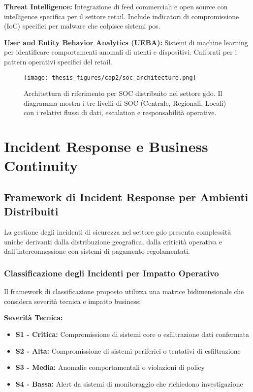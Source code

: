 \textbf{Threat Intelligence:} Integrazione di feed commerciali e open source con intelligence specifica per il settore retail. Include indicatori di compromissione (IoC) specifici per malware che colpisce sistemi \gls{pos}.

\textbf{User and Entity Behavior Analytics (UEBA):} Sistemi di machine learning per identificare comportamenti anomali di utenti e dispositivi. Calibrati per i pattern operativi specifici del retail.

\begin{figure}[htbp]
\centering
\texttt{[image: thesis\_figures/cap2/soc\_architecture.png]}
\caption{Architettura di riferimento per SOC distribuito nel settore \gls{gdo}. Il diagramma mostra i tre livelli di SOC (Centrale, Regionali, Locali) con i relativi flussi di dati, escalation e responsabilità operative.}
\label{fig:soc_architecture}
\end{figure}

\section{\texorpdfstring{Incident Response e Business Continuity}{2.5 - Incident Response e Business Continuity}}
\label{sec:2.5_incident_response}

\subsection{\texorpdfstring{Framework di Incident Response per Ambienti Distribuiti}{2.5.1 - Framework di Incident Response per Ambienti Distribuiti}}
\label{subsec:2.5.1_framework_ir}

La gestione degli incidenti di sicurezza nel settore \gls{gdo} presenta complessità uniche derivanti dalla distribuzione geografica, dalla criticità operativa e dall'interconnessione con sistemi di pagamento regolamentati.

\subsubsection{Classificazione degli Incidenti per Impatto Operativo}

Il framework di classificazione proposto utilizza una matrice bidimensionale che considera severità tecnica e impatto business:

\textbf{Severità Tecnica:}
\begin{itemize}
\item \textbf{S1 - Critica:} Compromissione di sistemi core o esfiltrazione dati confermata
\item \textbf{S2 - Alta:} Compromissione di sistemi periferici o tentativi di esfiltrazione
\item \textbf{S3 - Media:} Anomalie comportamentali o violazioni di policy
\item \textbf{S4 - Bassa:} Alert da sistemi di monitoraggio che richiedono investigazione
\end{itemize}

